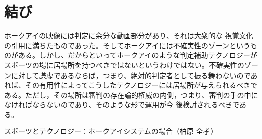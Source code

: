 \documentclass[twocolumn, a4j]{article}
\begin{document}
\section{結び}

ホークアイの映像には判定に余分な動画部分があり、それは大衆的な 視覚文化の引用に満ちたものであった。そしてホークアイには不確実性のゾーンというものがある。しかし、だからといってホークアイのような判定補助テクノロジーがスポーツの場に居場所を持つべきではないというわけではない。不確実性のゾーンに対して謙虚であるならば，つまり、絶対的判定者として振る舞わないのであれば、その有用性によってこうしたテクノロジーには居場所が与えられるべきである。ただし，その場所は審判の存在論的権威の内側，つまり、審判の手の中になければならないのであり、そのような形で運用が今 後検討されるべきである。

\renewcommand{\refname}{参考文献}
\begin{thebibliography}{数字}
   スポーツとテクノロジー：ホークアイシステムの場合（柏原 全孝）
\end{thebibliography}
\end{document}
